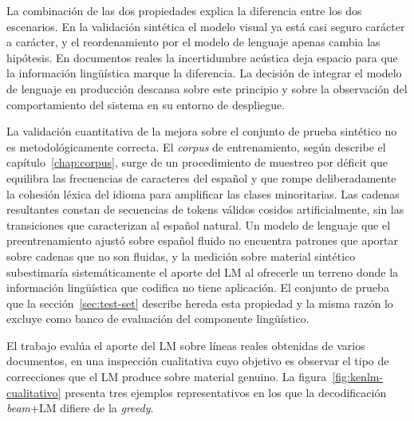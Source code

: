 La combinación de las dos propiedades explica la diferencia entre los dos escenarios. En la validación sintética el modelo visual ya está casi seguro carácter a carácter, y el reordenamiento por el modelo de lenguaje apenas cambia las hipótesis. En documentos reales la incertidumbre acústica deja espacio para que la información lingüística marque la diferencia. La decisión de integrar el modelo de lenguaje en producción descansa sobre este principio y sobre la observación del comportamiento del sistema en su entorno de despliegue.

La validación cuantitativa de la mejora sobre el conjunto de prueba sintético no es metodológicamente correcta. El \textit{corpus} de entrenamiento, según describe el capítulo~\ref{chap:corpus}, surge de un procedimiento de muestreo por déficit que equilibra las frecuencias de caracteres del español y que rompe deliberadamente la cohesión léxica del idioma para amplificar las clases minoritarias. Las cadenas resultantes constan de secuencias de tokens válidos cosidos artificialmente, sin las transiciones que caracterizan al español natural. Un modelo de lenguaje que el preentrenamiento ajustó sobre español fluido no encuentra patrones que aportar sobre cadenas que no son fluidas, y la medición sobre material sintético subestimaría sistemáticamente el aporte del LM al ofrecerle un terreno donde la información lingüística que codifica no tiene aplicación. El conjunto de prueba que la sección~\ref{sec:test-set} describe hereda esta propiedad y la misma razón lo excluye como banco de evaluación del componente lingüístico.

El trabajo evalúa el aporte del LM sobre líneas reales obtenidas de varios documentos, en una inspección cualitativa cuyo objetivo es observar el tipo de correcciones que el LM produce sobre material genuino. La figura~\ref{fig:kenlm-cualitativo} presenta tres ejemplos representativos en los que la decodificación \textit{beam}+LM difiere de la \textit{greedy}.

